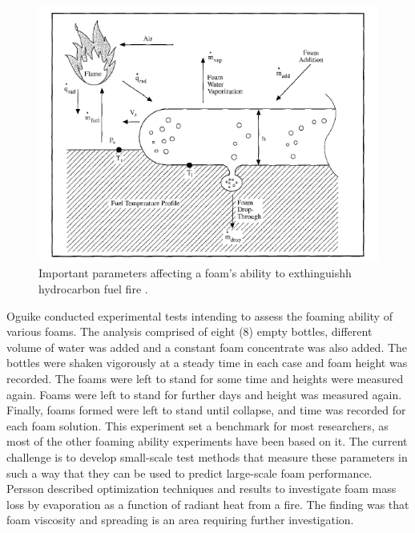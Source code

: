 \documentclass[12pt]{report}
\begin{document}
\begin{figure}[H]
    \centering
    \includegraphics[width=\textwidth]{important_parameters.png}
    \caption{Important parameters affecting a foam's ability to exthinguishh hydrocarbon fuel fire \cite{scheffey1995evaluating}.}
    \label{ch2:figure:parameters}
\end{figure}

Oguike \cite{oguike2013study} conducted experimental tests intending to assess the foaming ability of various foams. The analysis comprised of eight (8) empty bottles, different volume of water was added and a constant foam concentrate was also added. The bottles were shaken vigorously at a steady time in each case and foam height was recorded. The foams were left to stand for some time and heights were measured again. Foams were left to stand for further days and height was measured again. Finally, foams formed were left to stand until collapse, and time was recorded for each foam solution. This experiment set a benchmark for most researchers, as most of the other foaming ability experiments have been based on it.
The current challenge is to develop small-scale test methods that measure these parameters in such a way that they can be used to predict large-scale foam performance. Persson \cite{persson1992fire} described optimization techniques and results to investigate foam mass loss by evaporation as a function of radiant heat from a fire. The finding was that foam viscosity and spreading is an area requiring further investigation. 
\end{document}
